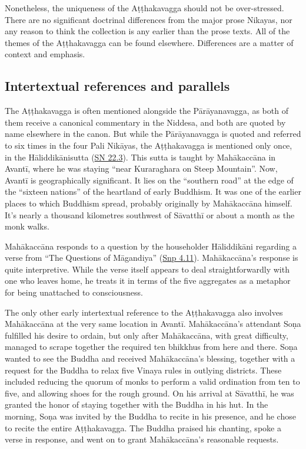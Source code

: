 \documentclass[12pt,openany]{book}%
\begin{document}
Nonetheless, the uniqueness of the \textsanskrit{Aṭṭhakavagga} should not be over-stressed. There are no significant doctrinal differences from the major prose Nikayas, nor any reason to think the collection is any earlier than the prose texts. All of the themes of the \textsanskrit{Aṭṭhakavagga} can be found elsewhere. Differences are a matter of context and emphasis.

\subsection*{Intertextual references and parallels}

The \textsanskrit{Aṭṭhakavagga} is often mentioned alongside the \textsanskrit{Pārāyanavagga}, as both of them receive a canonical commentary in the Niddesa, and both are quoted by name elsewhere in the canon. But while the \textsanskrit{Pārāyanavagga} is quoted and referred to six times in the four Pali \textsanskrit{Nikāyas}, the \textsanskrit{Aṭṭhakavagga} is mentioned only once, in the \textsanskrit{Hāliddikānisutta} (\href{https://suttacentral.net/sn22.3/en/sujato}{SN 22.3}). This sutta is taught by \textsanskrit{Mahākaccāna} in \textsanskrit{Avantī}, where he was staying “near Kuraraghara on Steep Mountain”. Now, \textsanskrit{Avantī} is geographically significant. It lies on the “southern road” at the edge of the “sixteen nations” of the heartland of early Buddhism. It was one of the earlier places to which Buddhism spread, probably originally by \textsanskrit{Mahākaccāna} himself. It’s nearly a thousand kilometres southwest of \textsanskrit{Sāvatthī} or about a month as the monk walks.

\textsanskrit{Mahākaccāna} responds to a question by the householder \textsanskrit{Hāliddikāni} regarding a verse from “The Questions of \textsanskrit{Māgandiya}” (\href{https://suttacentral.net/snp4.11/en/sujato}{Snp 4.11}). \textsanskrit{Mahākaccāna}’s response is quite interpretive. While the verse itself appears to deal straightforwardly with one who leaves home, he treats it in terms of the five aggregates as a metaphor for being unattached to consciousness.

The only other early intertextual reference to the \textsanskrit{Aṭṭhakavagga} also involves \textsanskrit{Mahākaccāna} at the very same location in \textsanskrit{Avantī}. \textsanskrit{Mahākaccāna}’s attendant \textsanskrit{Soṇa} fulfilled his desire to ordain, but only after \textsanskrit{Mahākaccāna}, with great difficulty, managed to scrape together the required ten bhikkhus from here and there. \textsanskrit{Soṇa} wanted to see the Buddha and received \textsanskrit{Mahākaccāna}’s blessing, together with a request for the Buddha to relax five Vinaya rules in outlying districts. These included reducing the quorum of monks to perform a valid ordination from ten to five, and allowing shoes for the rough ground. On his arrival at \textsanskrit{Sāvatthī}, he was granted the honor of staying together with the Buddha in his hut. In the morning, \textsanskrit{Soṇa} was invited by the Buddha to recite in his presence, and he chose to recite the entire \textsanskrit{Aṭṭhakavagga}. The Buddha praised his chanting, spoke a verse in response, and went on to grant \textsanskrit{Mahākaccāna}’s reasonable requests.
\end{document}
